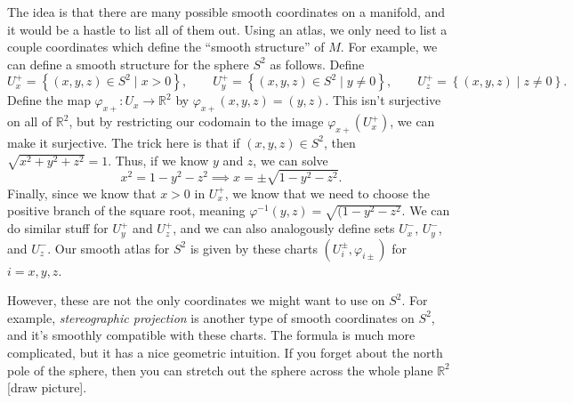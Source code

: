 The idea is that there are many possible smooth coordinates on a manifold, and it would be a hastle to list all of them out. Using an atlas, we only need to list a couple coordinates which define the ``smooth structure'' of $M$. For example, we can define a smooth structure for the sphere $S^2$ as follows. Define
\[
	U_x^+ = \left\{ (x,y,z)\in S^2 \mid x> 0 \right\} ,\qquad U_y^+ = \left\{ (x,y,z)\in S^2 \mid y\neq 0 \right\} ,\qquad U_z^+ = \left\{ (x,y,z) \mid z \neq 0 \right\} 
.\]
Define the map $\varphi _{x+} : U_x \to \mathbb{R} ^2$ by $\varphi _{x+}(x,y,z) = (y,z)$. This isn't surjective on all of $\mathbb{R} ^2$, but by restricting our codomain to the image $\varphi_{x+}(U_x^+)$, we can make it surjective.  The trick here is that if $(x,y,z)\in S^2$, then $\sqrt{x^2 + y^2 + z^2} =1$. Thus, if we know $y$ and $z$, we can solve
\[
	x^2 = 1 - y^2 - z^2 \implies x = \pm \sqrt{1-y^2-z^2} 
.\]
Finally, since we know that $x>0$ in $U_x^+$, we know that we need to choose the positive branch of the square root, meaning $\varphi ^{-1} (y,z) = \sqrt{(1-y^2 - z^2} $.  We can do similar stuff for $U_y^+$ and $U_z^+$, and we can also analogously define sets $U_x^-$, $U_y^-$, and $U_z^-$. Our smooth atlas for $S^2$ is given by these charts $(U_{i}^{\pm} ,\varphi _{i\pm} )$ for $i=x,y,z$.

However, these are not the only coordinates we might want to use on $S^2$. For example, \emph{stereographic projection} is another type of smooth coordinates on $S^2$, and it's smoothly compatible with these charts. The formula is much more complicated, but it has a nice geometric intuition. If you forget about the north pole of the sphere, then you can stretch out the sphere across the whole plane $\mathbb{R} ^2$ [draw picture].

